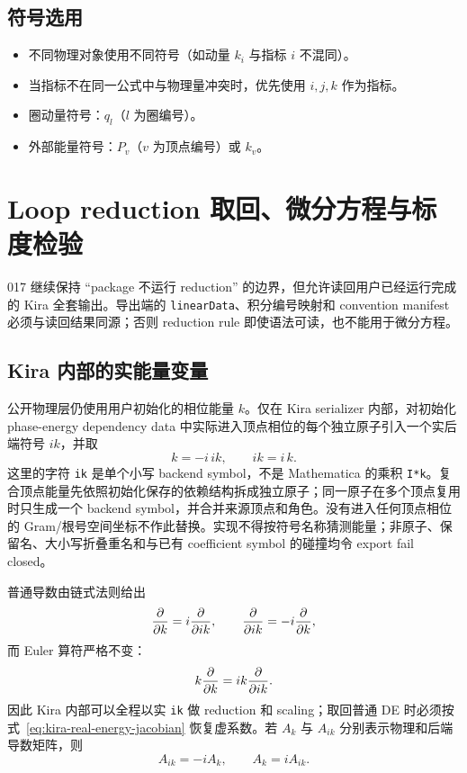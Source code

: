 ﻿\documentclass[a4paper,11pt]{article}
\begin{document}
\subsection{符号选用}

\begin{itemize}
  \item 不同物理对象使用不同符号（如动量 $k_i$ 与指标 $i$ 不混同）。
  \item 当指标不在同一公式中与物理量冲突时，优先使用 $i, j, k$ 作为指标。
  \item 圈动量符号：$q_l$（$l$ 为圈编号）。
  \item 外部能量符号：$P_v$（$v$ 为顶点编号）或 $k_v$。
\end{itemize}

\section{Loop reduction 取回、微分方程与标度检验}

017 继续保持 ``package 不运行 reduction'' 的边界，但允许读回用户已经运行完成的 Kira 全套输出。导出端的 \texttt{linearData}、积分编号映射和 convention manifest 必须与读回结果同源；否则 reduction rule 即使语法可读，也不能用于微分方程。

\subsection{Kira 内部的实能量变量}

公开物理层仍使用用户初始化的相位能量 $k$。仅在 Kira serializer 内部，对初始化 phase-energy dependency data 中实际进入顶点相位的每个独立原子引入一个实后端符号 $ik$，并取
\begin{equation}
 k=-i\,ik,\qquad ik=i\,k.
 \label{eq:kira-real-energy-map}
\end{equation}
这里的字符 \texttt{ik} 是单个小写 backend symbol，不是 Mathematica 的乘积 \texttt{I*k}。复合顶点能量先依照初始化保存的依赖结构拆成独立原子；同一原子在多个顶点复用时只生成一个 backend symbol，并合并来源顶点和角色。没有进入任何顶点相位的 Gram/根号空间坐标不作此替换。实现不得按符号名称猜测能量；非原子、保留名、大小写折叠重名和与已有 coefficient symbol 的碰撞均令 export fail closed。

普通导数由链式法则给出
\begin{equation}
 {\partial\over\partial k}=i{\partial\over\partial ik},
 \qquad
 {\partial\over\partial ik}=-i{\partial\over\partial k},
 \label{eq:kira-real-energy-jacobian}
\end{equation}
而 Euler 算符严格不变：
\begin{equation}
 k{\partial\over\partial k}=ik{\partial\over\partial ik}.
 \label{eq:kira-real-energy-euler}
\end{equation}
因此 Kira 内部可以全程以实 \texttt{ik} 做 reduction 和 scaling；取回普通 DE 时必须按式~\eqref{eq:kira-real-energy-jacobian} 恢复虚系数。若 $A_k$ 与 $A_{ik}$ 分别表示物理和后端导数矩阵，则
\begin{equation}
 A_{ik}=-iA_k,\qquad A_k=iA_{ik}.
\end{equation}
\end{document}
